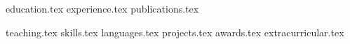 \documentclass[letterpaper,11pt]{article}
\begin{document}

{education.tex}
{experience.tex}
{publications.tex}

\pagebreak

{teaching.tex}
\sidebyside
    {{skills.tex}}
    {{languages.tex}}
{projects.tex}
{awards.tex}
{extracurricular.tex}
\end{document}
